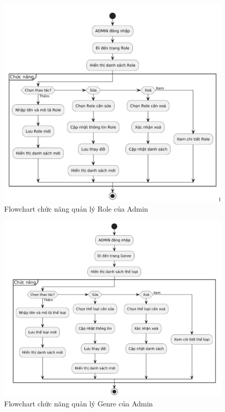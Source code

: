 \begin{figure}
    \centering
    \includegraphics[width=1\linewidth]{images/flowchart-admin-role.png}
    \caption{Flowchart chức năng quản lý Role của Admin}
    \label{fig:flowchart-admin-role}
\end{figure}

\begin{figure}
    \centering
    \includegraphics[width=1\linewidth]{images/flowchart-admin-genre.png}
    \caption{Flowchart chức năng quản lý Genre của Admin}
    \label{fig:flowchart-admin-genre}
\end{figure}

